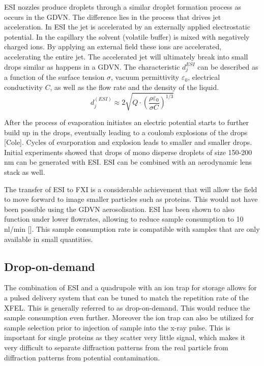 ESI nozzles produce droplets through a similar droplet formation process as occurs in the GDVN. The difference lies in the process that drives jet acceleration. In ESI the jet is accelerated by an externally applied electrostatic potential. In the capillary the solvent (volatile buffer) is mixed with negatively charged ions. By applying an external field these ions are accelerated, accelerating the entire jet. The accelerated jet will ultimately break into small drops similar as happens in a GDVN. The characteristic $d_j^{ESI}$ can be described as a function of the surface tension $\sigma$, vacuum permittivity $\varepsilon_0$, electrical conductivity $C$, as well as the flow rate and the density of the liquid.
\begin{equation}
d_j^{(ESI)} \approx 2 \sqrt{Q \cdot \left(\frac{\rho \varepsilon_0}{\sigma C}\right)^{1/3}}
\end{equation}

After the process of evaporation initiates an electric potential starts to further build up in the drops, eventually leading to a coulomb explosions of the drops [Cole]. Cycles of evarporation and explosion leads to smaller and smaller drops. Initial experiments showed that drops of mono disperse droplets of size 150-200 nm can be generated with ESI. ESI can be combined with an aerodynamic lens stack as well. 

The transfer of ESI to FXI is a considerable achievement that will allow the field to move forward to image smaller particles such as proteins. This would not have been possible using the GDVN aerosolisation. ESI has been shown to also function under lower flowrates, allowing to reduce sample consumption to 10 nl/min []. This sample consumption rate is compatible with samples that are only available in small quantities. 

\subsection{Drop-on-demand}
The combination of ESI and a quadrupole with an ion trap for storage allows for a pulsed delivery system that can be tuned to match the repetition rate of the XFEL. This is generally referred to as drop-on-demand. This would reduce the sample consumption even further. Moreover the ion trap can also be utilized for sample selection prior to injection of sample into the x-ray pulse. This is important for single proteins as they scatter very little signal, which makes it very difficult to separate diffraction patterns from the real particle from diffraction patterns from potential contamination. 


